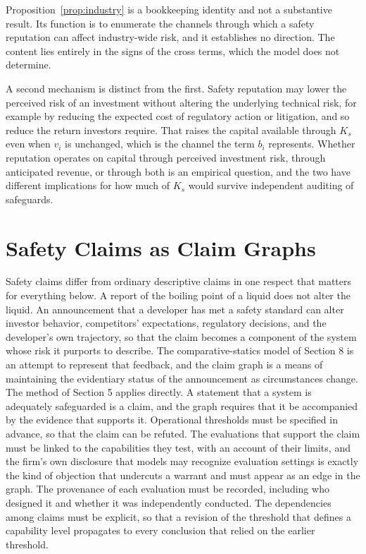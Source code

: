 \documentclass[12pt]{article}
\theoremstyle{definition}
\theoremstyle{remark}
\begin{document}
Proposition~\ref{prop:industry} is a bookkeeping identity and not a substantive result. Its function is to enumerate the channels through which a safety reputation can affect industry-wide risk, and it establishes no direction. The content lies entirely in the signs of the cross terms, which the model does not determine.

A second mechanism is distinct from the first. Safety reputation may lower the perceived risk of an investment without altering the underlying technical risk, for example by reducing the expected cost of regulatory action or litigation, and so reduce the return investors require. That raises the capital available through $K_s$ even when $v_i$ is unchanged, which is the channel the term $b_i$ represents. Whether reputation operates on capital through perceived investment risk, through anticipated revenue, or through both is an empirical question, and the two have different implications for how much of $K_s$ would survive independent auditing of safeguards.

\section{Safety Claims as Claim Graphs}

Safety claims differ from ordinary descriptive claims in one respect that matters for everything below. A report of the boiling point of a liquid does not alter the liquid. An announcement that a developer has met a safety standard can alter investor behavior, competitors' expectations, regulatory decisions, and the developer's own trajectory, so that the claim becomes a component of the system whose risk it purports to describe. The comparative-statics model of Section 8 is an attempt to represent that feedback, and the claim graph is a means of maintaining the evidentiary status of the announcement as circumstances change. The method of Section 5 applies directly. A statement that a system is adequately safeguarded is a claim, and the graph requires that it be accompanied by the evidence that supports it. Operational thresholds must be specified in advance, so that the claim can be refuted. The evaluations that support the claim must be linked to the capabilities they test, with an account of their limits, and the firm's own disclosure that models may recognize evaluation settings is exactly the kind of objection that undercuts a warrant and must appear as an edge in the graph. The provenance of each evaluation must be recorded, including who designed it and whether it was independently conducted. The dependencies among claims must be explicit, so that a revision of the threshold that defines a capability level propagates to every conclusion that relied on the earlier threshold.
\end{document}
